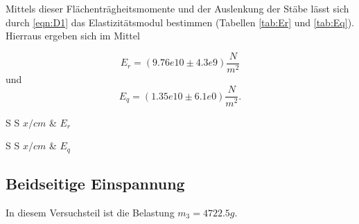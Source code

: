 Mittels dieser Flächenträgheitsmomente und der Auslenkung der Stäbe lässt sich durch \eqref{eqn:D1} das Elastizitätsmodul bestimmen (Tabellen \ref{tab:Er} und \ref{tab:Eq}). Hierraus ergeben sich im Mittel

\begin{equation*}
  E_r = \left(9.76e10 \pm 4.3e9 \right) \frac{N}{m^2}
\end{equation*}
und
\begin{equation*}
  E_q = \left(1.35e10 \pm 6.1 e0 \right) \frac{N}{m^2}.
\end{equation*}

\begin{table}
  \centering
  \caption{$E_r$ berechnet aus $x$}
  \label{tab:Er}
  \begin{tabular}{S S}
    \toprule
    {$x/cm$} & {$E_r$}\\
    \midrule
  \end{tabular}
\end{table}

\begin{table}
  \centering
  \caption{$E_q$ berechnet aus $x$}
  \label{tab:Eq}
  \begin{tabular}{S S}
    \toprule
    {$x/cm$} & {$E_q$}\\
    \midrule
  \end{tabular}
\end{table}

\subsection{Beidseitige Einspannung}
\label{sec:Beidseitig}
In diesem Versuchsteil ist die Belastung $m_3 = 4722.5g$.
